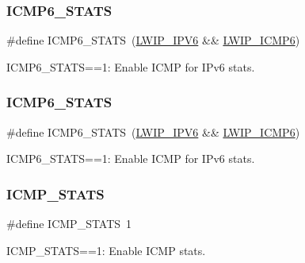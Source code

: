 \subsubsection{\texorpdfstring{I\+C\+M\+P6\+\_\+\+S\+T\+A\+TS}{ICMP6\_STATS}\hspace{0.1cm}{\footnotesize\ttfamily [1/2]}}
{\footnotesize\ttfamily \#define I\+C\+M\+P6\+\_\+\+S\+T\+A\+TS~(\hyperlink{openmote-cc2538_2lwip_2test_2fuzz_2lwipopts_8h_a872e3bb3fe2212156d66b18fccc9643f}{L\+W\+I\+P\+\_\+\+I\+P\+V6} \&\& \hyperlink{group__lwip__opts__icmp6_ga65ac8bcbad242cba3a2b557e1574b21f}{L\+W\+I\+P\+\_\+\+I\+C\+M\+P6})}

I\+C\+M\+P6\+\_\+\+S\+T\+A\+TS==1\+: Enable I\+C\+MP for I\+Pv6 stats. \mbox{\label{group__lwip__opts__stats_ga714006cd5c5b0eb333159d0f677616a0}} 
\subsubsection{\texorpdfstring{I\+C\+M\+P6\+\_\+\+S\+T\+A\+TS}{ICMP6\_STATS}\hspace{0.1cm}{\footnotesize\ttfamily [2/2]}}
{\footnotesize\ttfamily \#define I\+C\+M\+P6\+\_\+\+S\+T\+A\+TS~(\hyperlink{openmote-cc2538_2lwip_2test_2fuzz_2lwipopts_8h_a872e3bb3fe2212156d66b18fccc9643f}{L\+W\+I\+P\+\_\+\+I\+P\+V6} \&\& \hyperlink{group__lwip__opts__icmp6_ga65ac8bcbad242cba3a2b557e1574b21f}{L\+W\+I\+P\+\_\+\+I\+C\+M\+P6})}

I\+C\+M\+P6\+\_\+\+S\+T\+A\+TS==1\+: Enable I\+C\+MP for I\+Pv6 stats. \mbox{\label{group__lwip__opts__stats_ga472ad3f6da741f5b287d66ad3051242b}} 
\subsubsection{\texorpdfstring{I\+C\+M\+P\+\_\+\+S\+T\+A\+TS}{ICMP\_STATS}\hspace{0.1cm}{\footnotesize\ttfamily [1/2]}}
{\footnotesize\ttfamily \#define I\+C\+M\+P\+\_\+\+S\+T\+A\+TS~1}

I\+C\+M\+P\+\_\+\+S\+T\+A\+TS==1\+: Enable I\+C\+MP stats. \mbox{\label{group__lwip__opts__stats_ga472ad3f6da741f5b287d66ad3051242b}} 
